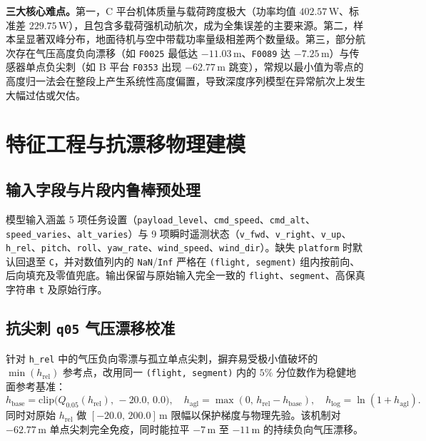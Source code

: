 \documentclass[UTF8,a4paper,11pt,fontset=windows]{ctexart}
\newcommand{\W}{\,\mathrm{W}}
\newcommand{\code}[1]{\texttt{#1}}
\begin{document}
\textbf{三大核心难点。}第一，C 平台机体质量与载荷跨度极大（功率均值 $402.57\W$、标准差 $229.75\W$），且包含多载荷强机动航次，成为全集误差的主要来源。第二，样本呈显著双峰分布，地面待机与空中带载功率量级相差两个数量级。第三，部分航次存在气压高度负向漂移（如 \code{F0025} 最低达 $-11.03\,\mathrm{m}$、\code{F0089} 达 $-7.25\,\mathrm{m}$）与传感器单点负尖刺（如 B 平台 \code{F0353} 出现 $-62.77\,\mathrm{m}$ 跳变），常规以最小值为零点的高度归一法会在整段上产生系统性高度偏置，导致深度序列模型在异常航次上发生大幅过估或欠估。

\section{特征工程与抗漂移物理建模}

\subsection{输入字段与片段内鲁棒预处理}

模型输入涵盖 5 项任务设置（\code{payload\_level}、\code{cmd\_speed}、\code{cmd\_alt}、\code{speed\_varies}、\code{alt\_varies}）与 9 项瞬时遥测状态（\code{v\_fwd}、\code{v\_right}、\code{v\_up}、\code{h\_rel}、\code{pitch}、\code{roll}、\code{yaw\_rate}、\code{wind\_speed}、\code{wind\_dir}）。缺失 \code{platform} 时默认回退至 \code{C}，并对数值列内的 \code{NaN}/\code{Inf} 严格在 \code{(flight, segment)} 组内按前向、后向填充及零值兜底。输出保留与原始输入完全一致的 \code{flight}、\code{segment}、高保真字符串 \code{t} 及原始行序。

\subsection{抗尖刺 \texttt{q05} 气压漂移校准}

针对 \code{h\_rel} 中的气压负向零漂与孤立单点尖刺，摒弃易受极小值破坏的 $\min(h_{\mathrm{rel}})$ 参考点，改用同一 \code{(flight, segment)} 内的 $5\%$ 分位数作为稳健地面参考基准：
\begin{equation}
  h_{\mathrm{base}} = \mathrm{clip}\bigl(Q_{0.05}(h_{\mathrm{rel}}),\,-20.0,\,0.0\bigr),\quad
  h_{\mathrm{agl}} = \max(0,\,h_{\mathrm{rel}}-h_{\mathrm{base}}),\quad
  h_{\log} = \ln(1+h_{\mathrm{agl}}).
  \label{eq:q05_alt}
\end{equation}
同时对原始 $h_{\mathrm{rel}}$ 做 $[-20.0,\,200.0]\,\mathrm{m}$ 限幅以保护梯度与物理先验。该机制对 $-62.77\,\mathrm{m}$ 单点尖刺完全免疫，同时能拉平 $-7\,\mathrm{m}$ 至 $-11\,\mathrm{m}$ 的持续负向气压漂移。
\end{document}
